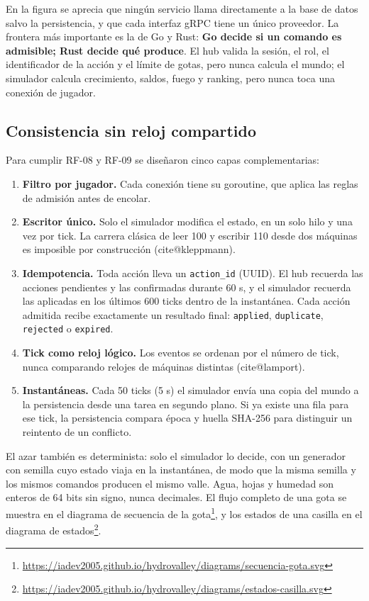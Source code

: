 \documentclass[11pt,letterpaper]{article}
\makeatletter
\newcommand{\parencite}[1]{(\csname cite@#1\endcsname)}
\newcommand{\site}{https://iadev2005.github.io/hydrovalley}
\newcommand{\diag}[2]{#2\footnote{\url{\site/diagrams/#1}}}
\makeatother
\begin{document}
En la figura se aprecia que ningún servicio llama directamente a la base de datos salvo la persistencia, y que cada interfaz gRPC tiene un único proveedor. La frontera más importante es la de Go y Rust: \textbf{Go decide si un comando es admisible; Rust decide qué produce}. El hub valida la sesión, el rol, el identificador de la acción y el límite de gotas, pero nunca calcula el mundo; el simulador calcula crecimiento, saldos, fuego y ranking, pero nunca toca una conexión de jugador.

\subsection{Consistencia sin reloj compartido}

Para cumplir RF-08 y RF-09 se diseñaron cinco capas complementarias:
\begin{enumerate}
\item \textbf{Filtro por jugador.} Cada conexión tiene su goroutine, que aplica las reglas de admisión antes de encolar.
\item \textbf{Escritor único.} Solo el simulador modifica el estado, en un solo hilo y una vez por tick. La carrera clásica de leer 100 y escribir 110 desde dos máquinas es imposible por construcción \parencite{kleppmann}.
\item \textbf{Idempotencia.} Toda acción lleva un \texttt{action\_id} (UUID). El hub recuerda las acciones pendientes y las confirmadas durante 60 s, y el simulador recuerda las aplicadas en los últimos 600 ticks dentro de la instantánea. Cada acción admitida recibe exactamente un resultado final: \texttt{applied}, \texttt{duplicate}, \texttt{rejected} o \texttt{expired}.
\item \textbf{Tick como reloj lógico.} Los eventos se ordenan por el número de tick, nunca comparando relojes de máquinas distintas \parencite{lamport}.
\item \textbf{Instantáneas.} Cada 50 ticks (5 s) el simulador envía una copia del mundo a la persistencia desde una tarea en segundo plano. Si ya existe una fila para ese tick, la persistencia compara época y huella SHA-256 para distinguir un reintento de un conflicto.
\end{enumerate}

El azar también es determinista: solo el simulador lo decide, con un generador con semilla cuyo estado viaja en la instantánea, de modo que la misma semilla y los mismos comandos producen el mismo valle. Agua, hojas y humedad son enteros de 64 bits sin signo, nunca decimales. El flujo completo de una gota se muestra en el \diag{secuencia-gota.svg}{diagrama de secuencia de la gota}, y los estados de una casilla en el \diag{estados-casilla.svg}{diagrama de estados}.
\end{document}
